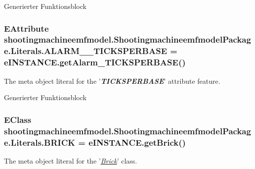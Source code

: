 Generierter Funktionsblock \hypertarget{interfaceshootingmachineemfmodel_1_1_shootingmachineemfmodel_package_1_1_literals_a39b5fb0f41af6418c8fce9f9311d818d}{
\subsubsection[{A\-L\-A\-R\-M\-\_\-\-\_\-\-T\-I\-C\-K\-S\-P\-E\-R\-B\-A\-S\-E}]{\setlength{\rightskip}{0pt plus 5cm}E\-Attribute shootingmachineemfmodel.\-Shootingmachineemfmodel\-Package.\-Literals.\-A\-L\-A\-R\-M\-\_\-\-\_\-\-T\-I\-C\-K\-S\-P\-E\-R\-B\-A\-S\-E = e\-I\-N\-S\-T\-A\-N\-C\-E.\-get\-Alarm\-\_\-\-T\-I\-C\-K\-S\-P\-E\-R\-B\-A\-S\-E()}}\label{interfaceshootingmachineemfmodel_1_1_shootingmachineemfmodel_package_1_1_literals_a39b5fb0f41af6418c8fce9f9311d818d}
The meta object literal for the '{\itshape {\bfseries T\-I\-C\-K\-S\-P\-E\-R\-B\-A\-S\-E}}' attribute feature.

Generierter Funktionsblock \hypertarget{interfaceshootingmachineemfmodel_1_1_shootingmachineemfmodel_package_1_1_literals_aeda309dbd4de2ccf2cad42f23991a952}{
\subsubsection[{B\-R\-I\-C\-K}]{\setlength{\rightskip}{0pt plus 5cm}E\-Class shootingmachineemfmodel.\-Shootingmachineemfmodel\-Package.\-Literals.\-B\-R\-I\-C\-K = e\-I\-N\-S\-T\-A\-N\-C\-E.\-get\-Brick()}}\label{interfaceshootingmachineemfmodel_1_1_shootingmachineemfmodel_package_1_1_literals_aeda309dbd4de2ccf2cad42f23991a952}
The meta object literal for the '\hyperlink{classshootingmachineemfmodel_1_1impl_1_1_brick_impl}{{\itshape Brick}}' class.

